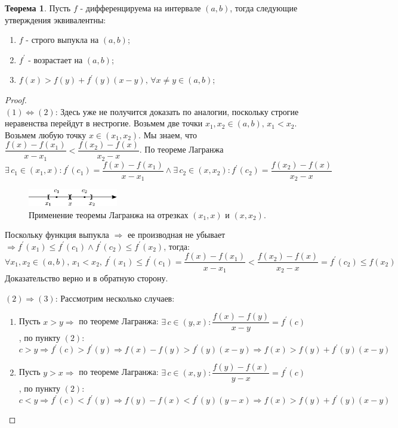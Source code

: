 \documentclass[12pt]{article}
\theoremstyle{definition}
\newtheorem{theorem}{Теорема}
\begin{document}
\begin{theorem}
	Пусть $f$ - дифференцируема на интервале $(a,b)$, тогда следующие утверждения эквивалентны:
	\begin{enumerate}[label={(\arabic*)}]
		\item $f$ - строго выпукла на $(a,b)$;
		\item $f^\prime$ - возрастает на $(a,b)$;
		\item $f(x) > f(y) + f^\prime(y)(x-y), \, \forall x \neq y \in (a,b)$;
	\end{enumerate}
\end{theorem}
\begin{proof}\hfill\\
	$(1) \Leftrightarrow (2)$: Здесь уже не получится доказать по аналогии, поскольку строгие неравенства перейдут в нестрогие. Возьмем две точки $x_1, x_2 \in (a,b), \, x_1 < x_2$. Возьмем любую точку $x \in (x_1,x_2)$. Мы знаем, что $\dfrac{f(x) - f(x_1)}{x - x_1} < \dfrac{f(x_2) - f(x)}{x_2 - x}$. По теореме Лагранжа 
	$$\exists \, c_1 \in (x_1,x) \colon f^\prime(c_1) = \dfrac{f(x) - f(x_1)}{x - x_1} \wedge \exists \, c_2 \in (x,x_2) \colon f^\prime(c_2) = \dfrac{f(x_2) - f(x)}{x_2 - x}$$
	\begin{figure}[H]
		\centering
		\includegraphics[width=0.35\textwidth]{28_2.eps}
		\caption{Применение теоремы Лагранжа на отрезках $(x_1,x)$ и $(x,x_2)$.}
		\label{28_2}
	\end{figure}
	Поскольку функция выпукла $\Rightarrow$ ее производная не убывает $\Rightarrow f^{\prime}(x_1) \leq f^\prime(c_1) \wedge f^\prime(c_2) \leq f^\prime(x_2)$, тогда:
	$$\forall x_1, x_2 \in (a,b),\, x_1 < x_2, \, f^{\prime}(x_1) \leq f^\prime(c_1) = \dfrac{f(x) - f(x_1)}{x - x_1} < \dfrac{f(x_2) - f(x)}{x_2 - x} = f^{\prime}(c_2) \leq f(x_2)$$
	Доказательство верно и в обратную сторону.
	
	$(2) \Rightarrow (3)$: Рассмотрим несколько случаев:
	\begin{enumerate}[label={\arabic*)}]
		\item Пусть $x > y \Rightarrow$ по теореме Лагранжа: $\exists \, c \in (y,x) \colon \dfrac{f(x) - f(y)}{x - y} = f^\prime(c)$, по пункту $(2)$:
		$$c > y \Rightarrow f^\prime(c) > f^\prime(y) \Rightarrow f(x) - f(y) > f^\prime(y)(x-y) \Rightarrow f(x) > f(y) + f^\prime(y)(x-y)$$
		\item Пусть $y > x \Rightarrow$ по теореме Лагранжа: $\exists \, c \in (x,y) \colon \dfrac{f(y) - f(x)}{y - x} = f^\prime(c)$, по пункту $(2)$:
		$$c < y \Rightarrow f^\prime(c) < f^\prime(y) \Rightarrow f(y) - f(x) < f^\prime(y)(y-x) \Rightarrow f(x) > f(y) + f^\prime(y)(x-y)$$
	\end{enumerate}
	

\end{proof}
\end{document}
